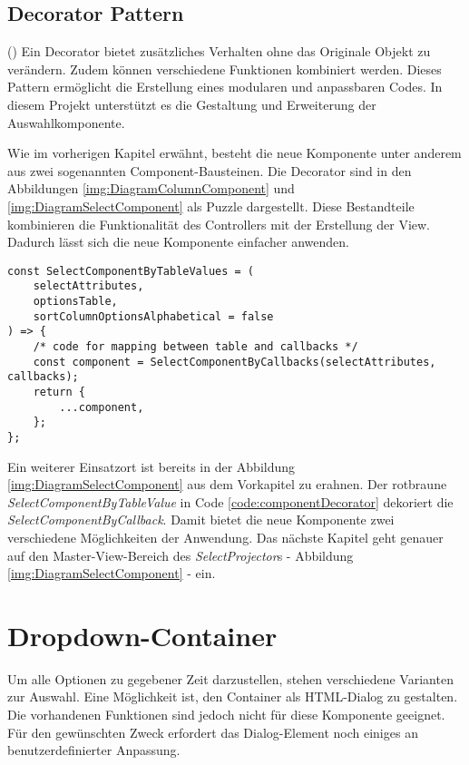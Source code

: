 \subsection{Decorator Pattern}
\label{sec:decoratorPattern}

(\cite{decoratorPattern}) Ein Decorator bietet zusätzliches Verhalten ohne das Originale Objekt zu verändern.
Zudem können verschiedene Funktionen kombiniert werden.
Dieses Pattern ermöglicht die Erstellung eines modularen und anpassbaren Codes.
In diesem Projekt unterstützt es die Gestaltung und Erweiterung der Auswahlkomponente.

Wie im vorherigen Kapitel erwähnt, besteht die neue Komponente unter anderem aus zwei sogenannten Component-Bausteinen.
Die Decorator sind in den Abbildungen \ref{img:DiagramColumnComponent} und \ref{img:DiagramSelectComponent} als Puzzle dargestellt.
Diese Bestandteile kombinieren die Funktionalität des Controllers mit der Erstellung der View.
Dadurch lässt sich die neue Komponente einfacher anwenden.

\begin{lstlisting}[style = htmlcssjs, caption = SelectComponentByTableValue dekoriert SelectComponentByCallback, label = code:componentDecorator]
const SelectComponentByTableValues = (
    selectAttributes,
    optionsTable,
    sortColumnOptionsAlphabetical = false
) => {
    /* code for mapping between table and callbacks */
    const component = SelectComponentByCallbacks(selectAttributes, callbacks);
    return {
        ...component,
    };
};
\end{lstlisting}

Ein weiterer Einsatzort ist bereits in der Abbildung \ref{img:DiagramSelectComponent} aus dem Vorkapitel zu erahnen.
Der rotbraune \emph{SelectComponentByTableValue} in Code \ref{code:componentDecorator} dekoriert die \emph{SelectComponentByCallback}.
Damit bietet die neue Komponente zwei verschiedene Möglichkeiten der Anwendung.
Das nächste Kapitel geht genauer auf den Master-View-Bereich des \emph{SelectProjector}s - Abbildung \ref{img:DiagramSelectComponent} - ein.


\section{Dropdown-Container}
\label{sec:dropdownContainer}

Um alle Optionen zu gegebener Zeit darzustellen, stehen verschiedene Varianten zur Auswahl.
Eine Möglichkeit ist, den Container als HTML-Dialog zu gestalten.
Die vorhandenen Funktionen sind jedoch nicht für diese Komponente geeignet.
Für den gewünschten Zweck erfordert das Dialog-Element noch einiges an benutzerdefinierter Anpassung.

